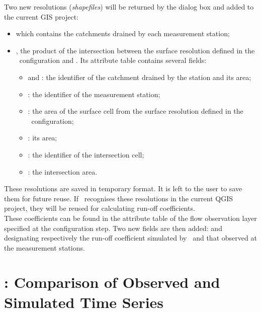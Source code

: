 Two new resolutions (\textit{shapefiles}) will be returned by the dialog box and added to the current GIS project:
\begin{itemize}
    \item {} which contains the catchments drained by each measurement
        station;

    \item {}, the product of the intersection between the surface resolution
        defined in the \cwv~configuration and . Its attribute table
        contains several fields:
        \begin{itemize}
            \item[$-$]  and : the identifier of the
                catchment drained by the station and its area;

            \item[$-$] : the identifier of the measurement station;

            \item[$-$] : the area of the surface cell
                from the surface resolution defined in the \cwv~configuration;

            \item[$-$] : its area;

            \item[$-$] : the identifier of the intersection cell;

            \item[$-$] : the intersection area.
        \end{itemize}
\end{itemize}

These resolutions are saved in temporary format. It is left to the user
to save them for future reuse. If \cwv~recognises these
resolutions in the current QGIS project, they will be reused for calculating
run-off coefficients.\\

These coefficients can be found in the attribute table of the flow observation layer specified at the configuration step. Two new fields are then
added:  and  designating respectively the
run-off coefficient simulated by \cawaqs~and that observed at the measurement stations.

\section{: Comparison of Observed and Simulated Time Series}
\label{sec-com-simobs}

